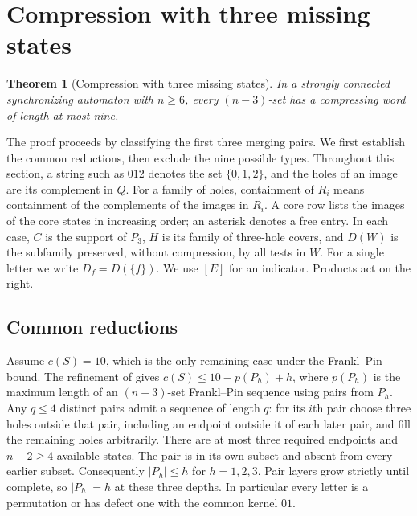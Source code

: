 \documentclass[11pt]{article}
\newtheorem{theorem}{Theorem}
\theoremstyle{definition}
\theoremstyle{plain}
\begin{document}
\section{Compression with three missing states}\label{app:codimension-three}
\begin{theorem}[Compression with three missing states]\label{lem:codimension-three}
In a strongly connected synchronizing automaton with $n\ge6$, every
$(n-3)$-set has a compressing word of length at most nine.
\end{theorem}

The proof proceeds by classifying the first three merging pairs. We first
establish the common reductions, then exclude the nine possible types.
Throughout this section, a string such as $012$ denotes the set
$\{0,1,2\}$, and the holes of an image are its complement in $Q$.
For a family of holes, containment of $R_i$ means containment of the
complements of the images in $R_i$. A core row lists the images of the
core states in increasing order; an asterisk denotes a free entry.
In each case, $C$ is the support of $P_3$, $H$ is its family of three-hole
covers, and $D(W)$ is the subfamily preserved, without compression, by
all tests in $W$. For a single letter we write $D_f=D(\{f\})$.
We use $[E]$ for an indicator. Products act on the right.

\subsection{Common reductions}\label{sec:c3-reductions}

Assume \(c(S)=10\), which is the only remaining case under the
Frankl--Pin bound. The refinement of \cite{kisielewicz2016} gives
\(c(S)\le10-p(P_h)+h\), where \(p(P_h)\) is the maximum length of an
\((n-3)\)-set Frankl--Pin sequence using pairs from \(P_h\). Any
\(q\le4\) distinct pairs admit a sequence of length \(q\): for its
\(i\)th pair choose three holes outside that pair, including an endpoint
outside it of each later pair, and fill the remaining holes arbitrarily.
There are at most three required endpoints and \(n-2\ge4\) available
states. The pair is in its own subset and absent from every earlier
subset. Consequently \(|P_h|\le h\) for \(h=1,2,3\). Pair layers grow
strictly until complete, so \(|P_h|=h\) at these three depths. In
particular every letter is a permutation or has defect one with the
common kernel \(01\).
\end{document}
